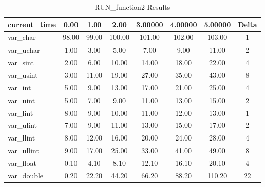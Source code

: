 \documentclass[11pt,fleqn]{report}
\begin{document}
\begin{table}[ht]
\centering
\caption{RUN\_function2 Results} \label{tbl:function2_results}
\begin{tabular}{|l|c|c|c|c|c|c|c|} \hline
\textbf{current\_time}	 & \textbf{0.00} & \textbf{1.00} & \textbf{2.00} &
\textbf{3.00000} & \textbf{4.00000} & \textbf{5.00000} & Delta \\ \hline
var\_char	   & 98.00 & 99.00 & 100.00 & 101.00 & 102.00 & 103.00 & 1 \\ \hline
var\_uchar	 & 1.00  & 3.00  & 5.00   & 7.00   & 9.00   & 11.00  & 2 \\ \hline
var\_sint	   & 2.00  & 6.00  & 10.00  & 14.00  & 18.00  & 22.00  & 4 \\ \hline
var\_usint	 & 3.00  & 11.00 & 19.00  & 27.00  & 35.00  & 43.00  & 8 \\ \hline
var\_int	   & 5.00  & 9.00  & 13.00  & 17.00  & 21.00  & 25.00  & 4 \\ \hline
var\_uint	   & 5.00  & 7.00  & 9.00   & 11.00  & 13.00  & 15.00  & 2 \\ \hline
var\_lint	   & 8.00  & 9.00  & 10.00  & 11.00  & 12.00  & 13.00  & 1 \\ \hline
var\_ulint	 & 7.00  & 9.00  & 11.00  & 13.00  & 15.00  & 17.00  & 2 \\ \hline
var\_llint	 & 8.00  & 12.00 & 16.00  & 20.00  & 24.00  & 28.00  & 4 \\ \hline
var\_ullint	 & 9.00  & 17.00 & 25.00  & 33.00  & 41.00  & 49.00  & 8 \\ \hline
var\_float	 & 0.10  & 4.10  & 8.10   & 12.10  & 16.10  & 20.10  & 4 \\ \hline
var\_double	 & 0.20  & 22.20 & 44.20  & 66.20  & 88.20  & 110.20 & 22\\ \hline
\end{tabular}
\end{table}

\clearpage
\end{document}
